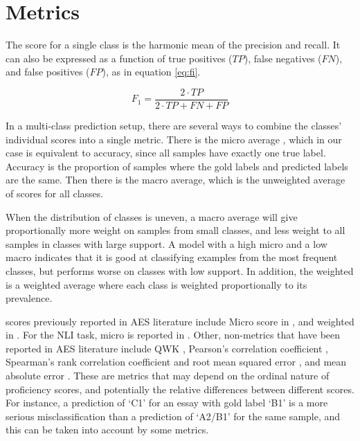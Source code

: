 \section{Metrics}

The \FI score for a single class is the harmonic mean of the precision and
recall. It can also be expressed as a function of true positives ($TP$),
false negatives ($FN$), and false positives ($FP$), as in equation
\ref{eq:fi}.

\begin{equation}\label{eq:fi}
  F_1 = {\frac{2\cdot TP}{2\cdot TP + FN + FP}}
\end{equation}

In a multi-class prediction setup, there are several ways to combine the
classes' individual \FI scores into a single metric. There is the micro
average \FI, which in our case is equivalent to accuracy, since all samples
have exactly one true label. Accuracy is the proportion of samples where the
gold labels and predicted labels are the same. Then there is the macro
average, which is the unweighted average of \FI scores for all classes.

When the distribution of classes is uneven, a macro average will give
proportionally more weight on samples from small classes, and less weight to
all samples in classes with large support. A model with a high micro \FI and
a low macro \FI indicates that it is good at classifying examples from the
most frequent classes, but performs worse on classes with low support. In
addition, the weighted \FI is a weighted average where each class is weighted
proportionally to its prevalence.

\FI scores previously reported in \ac{AES} literature include Micro \FI score
in \textcite{vajjala17}, and weighted \FI in
\textcite{vajjala18universalCEFR}. For the \ac{NLI} task, micro \FI is
reported in \textcite{malmasi15,malmasi17}. Other, non-\FI metrics that have
been reported in \ac{AES} literature include \ac{QWK} \autocite{taghipour16,
alikaniotis2016automatic}, Pearson's correlation coefficient
\autocite{vajjala17, alikaniotis2016automatic}, Spearman's rank correlation
coefficient and root mean squared error \autocite{alikaniotis2016automatic},
and mean absolute error \autocite{vajjala17}. These are metrics that may
depend on the ordinal nature of proficiency scores, and potentially the
relative differences between different scores. For instance, a prediction of
`C1' for an essay with gold label `B1' is a more serious misclassification
than a prediction of `A2/B1' for the same sample, and this can be taken into
account by some metrics.

